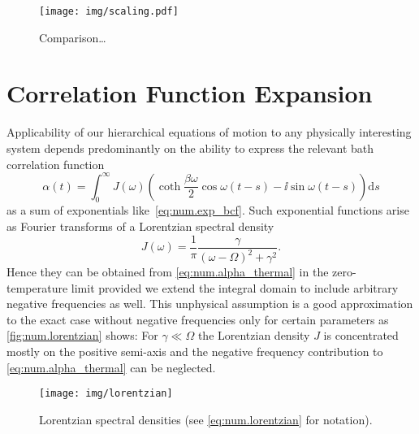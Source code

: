 \begin{figure}
  \centering
  \texttt{[image: img/scaling.pdf]}
  \caption{Comparison\dots}
  \label{fig:num.scaling}
\end{figure}


\section{Correlation Function Expansion}
\label{sec:num.expansion}
%


Applicability of our hierarchical equations of motion to any physically interesting system depends predominantly on the ability to express the relevant bath correlation function
\begin{equation}
  \alpha(t) = \int_0^\infty J(\omega) \left( \coth \frac{\beta \omega}{2} \cos \omega(t-s) - \ii\sin \omega(t-s) \right) \mathrm{d}s
  \label{eq:num.alpha_thermal}
\end{equation}
as a sum of exponentials like~\ref{eq:num.exp_bcf}.
Such exponential functions arise as Fourier transforms of a Lorentzian spectral density
\begin{equation}
  J(\omega) = \frac{1}{\pi} \frac{\gamma}{(\omega - \Omega)^2 + \gamma^2}.
  \label{eq:num.lorentzian}
\end{equation}
Hence they can be obtained from \autoref{eq:num.alpha_thermal} in the zero-temperature limit provided we extend the integral domain to include arbitrary negative frequencies as well.
This unphysical assumption is a good approximation to the exact case without negative frequencies only for certain parameters as \autoref{fig:num.lorentzian} shows:
For $\gamma\ll\Omega$ the Lorentzian density $J$ is concentrated mostly on the positive semi-axis and the negative frequency contribution to \autoref{eq:num.alpha_thermal} can be neglected.
\begin{figure}
  \centering
  \texttt{[image: img/lorentzian]}
  \caption{Lorentzian spectral densities (see \autoref{eq:num.lorentzian} for notation).}
  \label{fig:num.lorentzian}
\end{figure}

